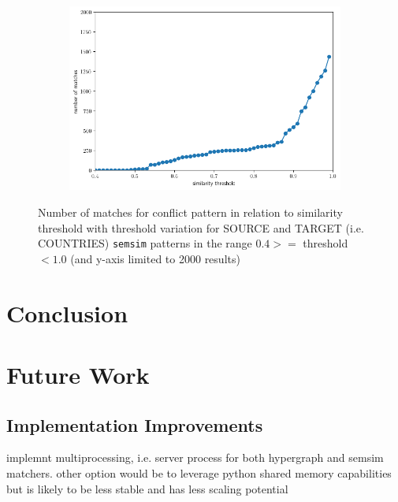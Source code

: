 \documentclass[11pt]{scrreprt}
\begin{document}
\begin{figure}
     \centering
     \begin{subfigure}[t]{0.9\textwidth}
         \includegraphics[width=\textwidth]{countries_20-most-popul_thresholds-countries_greater-0.4.png}
     \end{subfigure}
\caption{Number of matches for conflict pattern in relation to similarity threshold with threshold variation for \textsf{SOURCE} and \textsf{TARGET} (i.e. COUNTRIES) \texttt{semsim} patterns in the range \(0.4 >=\) threshold \(< 1.0\) (and y-axis limited to 2000 results)}
\label{fig:case-study-conflict-countries-2}   
\end{figure}


\chapter{Conclusion}

\chapter{Future Work}
\section{Implementation Improvements}
implemnt multiprocessing, i.e. server process for both hypergraph and semsim matchers. other option would be to leverage python shared memory capabilities but is likely to be less stable and has less scaling potential





\printbibliography
\end{document}
